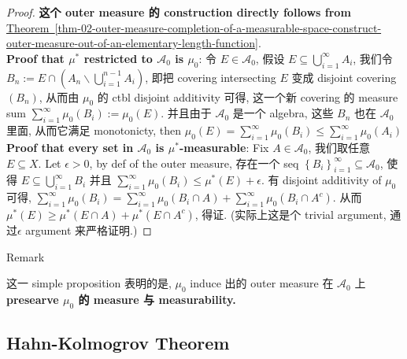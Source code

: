 \documentclass{qlnotes-export}
\begin{document}
\begin{proof}

\textbf{这个 outer measure 的 construction directly follows from} \hyperref[thm-02-outer-measure-completion-of-a-measurable-space-construct-outer-measure-out-of-an-elementary-length-function]{Theorem~\ref*{thm-02-outer-measure-completion-of-a-measurable-space-construct-outer-measure-out-of-an-elementary-length-function}}.\\
\textbf{Proof that \(\mu^{\ast}\) restricted to \(\mathcal{A}_{0}\) is \(\mu_{0}\)}: 令 \(E \in \mathcal{A}_{0}\), 假设 \(E \subseteq \bigcup_{i = 1}^{\infty}A_{i}\), 我们令 \(B_{n} := E \cap (A_{n}\backslash\bigcup_{i = 1}^{n - 1}A_{i})\), 即把 covering intersecting \(E\) 变成 disjoint covering \((B_{n})\), 从而由 \(\mu_{0}\) 的 ctbl disjoint additivity 可得, 这一个新 covering 的 measure sum \(\sum_{i = 1}^{\infty}\mu_{0}(B_{i}) := \mu_{0}(E)\). 并且由于 \(\mathcal{A}_{0}\) 是一个 algebra, 这些 \(B_{n}\) 也在 \(\mathcal{A}_{0}\) 里面, 从而它满足 monotonicty, then \(\mu_{0}(E) = \sum_{i = 1}^{\infty}\mu_{0}(B_{i}) \leq \sum_{i = 1}^{\infty}\mu_{0}(A_{i})\)\\
\textbf{Proof that every set in \(\mathcal{A}_{0}\) is \(\mu^{\ast}\)-measurable}: Fix \(A \in \mathcal{A}_{0}\), 我们取任意 \(E \subseteq X\). Let \(\epsilon > 0\), by def of the outer measure, 存在一个 seq \(\left\{ B_{i} \right\}_{i = 1}^{\infty} \subseteq \mathcal{A}_{0}\), 使得 \(E \subseteq \bigcup_{i = 1}^{\infty}B_{i}\) 并且 \(\sum_{i = 1}^{\infty}\mu_{0}(B_{i}) \leq \mu^{\ast}(E) + \epsilon\). 有 disjoint additivity of \(\mu_{0}\) 可得, \(\sum_{i = 1}^{\infty}\mu_{0}(B_{i}) = \sum_{i = 1}^{\infty}\mu_{0}(B_{i} \cap A) + \sum_{i = 1}^{\infty}\mu_{0}(B_{i} \cap A^{c})\). 从而 \(\mu^{\ast}(E) \geq \mu^{\ast}(E \cap A) + \mu^{\ast}(E \cap A^{c})\), 得证. (实际上这是个 trivial argument, 通过\(\epsilon\) argument 来严格证明.)

\end{proof}

\begin{qlremark}{Remark}

这一 simple proposition 表明的是, \(\mu_{0}\) induce 出的 outer measure 在 \(\mathcal{A}_{0}\) 上 \textbf{presearve \(\mu_{0}\) 的 measure 与 measurability.}

\end{qlremark}

\subsection{Hahn-Kolmogrov Theorem}\label{hahn-kolmogrov-theorem}
\end{document}
